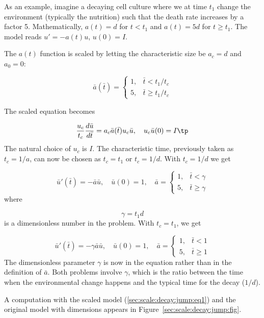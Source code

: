 \documentclass[graybox,envcountchap,sectrefs,final]{svmonodo}
\begin{document}
As an example, imagine a decaying cell culture where we at time $t_1$
change the environment (typically the nutrition)
such that the death rate increases by a factor 5.
Mathematically, $a(t) = d$ for
$t < t_1$ and $a(t)=5d$ for $t\geq t_1$. The model reads $u'=-a(t)u$, $u(0)=I$.

The $a(t)$ function is scaled by letting the characteristic size be
$a_c=d$ and $a_0=0$:

\[ \bar a (\bar t) = \left\lbrace\begin{array}{ll}
1, & \bar t < t_1/t_c\\ 
5, & \bar t \geq t_1/t_c
\end{array}\right.
\]


The scaled equation becomes

\[ \frac{u_c}{t_c}\frac{d\bar u}{d\bar t} = a_c\bar a(\bar t) u_c\bar u,\quad
u_c\bar u(0) = I\tp\]
The natural choice of $u_c$ is $I$.
The characteristic time, previously taken as $t_c=1/a$, can now be
chosen as $t_c=t_1$ or $t_c=1/d$.
With $t_c=1/d$ we get

\begin{equation}
\bar u'(\bar t)=-\bar a\bar u,\quad \bar u(0)=1,\quad
\bar a = \left\lbrace\begin{array}{ll}
1, & \bar t < \gamma\\ 
5, & \bar t \geq \gamma
\end{array}\right.
\label{sec:scale:decay:jump:eq1}
\end{equation}
where

\[ \gamma = t_1 d\]
is a dimensionless number in the problem. With $t_c=t_1$, we get

\[ \bar u'(\bar t)=-\gamma\bar a\bar u,\quad \bar u(0)=1,\quad
\bar a = \left\lbrace\begin{array}{ll}
1, & \bar t < 1\\ 
5, & \bar t \geq 1
\end{array}\right.\]
The dimensionless parameter $\gamma$ is now in the equation rather than in
the definition of $\bar a$. Both problems involve $\gamma$, which
is the ratio between the time when the environmental change happens
and the typical time for the decay ($1/d$).

A computation with the scaled model (\ref{sec:scale:decay:jump:eq1})
and the original model with dimensions appears in
Figure~\ref{sec:scale:decay:jump:fig}.
\end{document}
